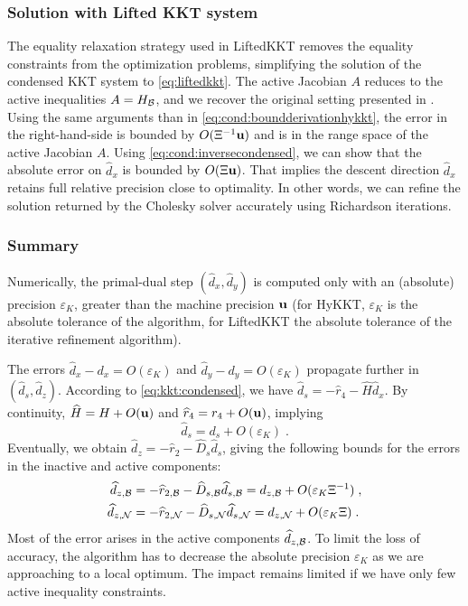 \subsubsection{Solution with Lifted KKT system}
The equality relaxation strategy used in LiftedKKT
removes the equality constraints from the optimization problems, simplifying
the solution of the condensed KKT system to \eqref{eq:liftedkkt}.
The active Jacobian $A$ reduces to the active inequalities $A = H_{\mathcal{B}}$,
and we recover the original setting presented in \cite{wright1998ill}.
Using the same arguments than in \eqref{eq:cond:boundderivationhykkt},
the error in the right-hand-side is bounded by $O(\Xi^{-1} \mathbf{u})$ and is in the
range space of the active Jacobian $A$. Using \eqref{eq:cond:inversecondensed},
we can show that the absolute error on $\widehat{d}_x$ is bounded by
$O(\Xi \mathbf{u})$. That implies the descent direction $\widehat{d}_x$ retains
full relative precision close to optimality.
In other words, we can refine the solution returned by the Cholesky solver accurately using
Richardson iterations.

\subsubsection{Summary}
Numerically, the primal-dual step $(\widehat{d}_x, \widehat{d}_y)$
is computed only with an (absolute) precision $\varepsilon_{K}$,
greater than the machine precision $\mathbf{u}$ (for HyKKT, $\varepsilon_K$
is the absolute tolerance of the \CG algorithm, for LiftedKKT the
absolute tolerance of the iterative refinement algorithm).

The errors $\widehat{d}_x - d_x = O(\varepsilon_K)$ and
$\widehat{d}_y - d_y = O(\varepsilon_K)$ propagate further in $(\widehat{d}_s, \widehat{d}_z)$.
According to \eqref{eq:kkt:condensed}, we have $\widehat{d}_s = - \widehat{r}_4 - \widehat{H} \widehat{d}_x$.
By continuity, $\widehat{H} = H + O(\mathbf{u})$ and $\widehat{r}_4 = r_4 + O(\mathbf{u})$, implying
\begin{equation}
  \widehat{d}_s = d_s + O(\varepsilon_K) \; .
\end{equation}
Eventually, we obtain $\widehat{d}_z = - \widehat{r}_2 - \widehat{D}_s \widehat{d}_s$,
giving the following bounds for the errors in the inactive and active components:
\begin{equation}
  \begin{aligned}
     \widehat{d}_{z,\mathcal{B}} &= -\widehat{r}_{2,\mathcal{B}} - \widehat{D}_{s,\mathcal{B}} \widehat{d}_{s,\mathcal{B}}
    = d_{z,\mathcal{B}} + O(\varepsilon_K \Xi^{-1}) \;,\\
                              \widehat{d}_{z,\mathcal{N}} &= -\widehat{r}_{2,\mathcal{N}} - \widehat{D}_{s,\mathcal{N}} \widehat{d}_{s,\mathcal{N}}
                               = d_{z,\mathcal{N}} + O(\varepsilon_K \Xi) \; .
  \end{aligned}
\end{equation}
Most of the error arises in the active components $\widehat{d}_{z,\mathcal{B}}$.
To limit the loss of accuracy, the algorithm has to decrease the absolute precision $\varepsilon_K$
as we are approaching to a local optimum.
The impact remains limited if we have only few active inequality constraints.


